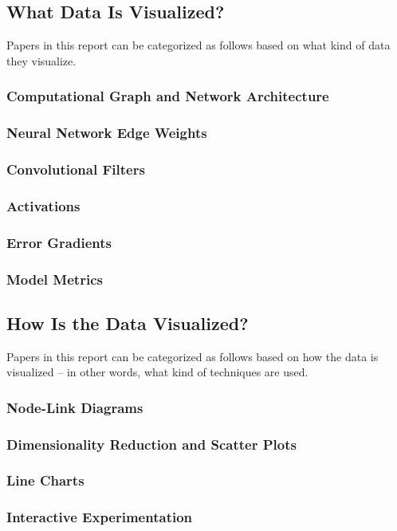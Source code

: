\documentclass{acmsiggraph}               %
\begin{document}
\subsection{What Data Is Visualized?}
Papers in this report can be categorized as follows based on what kind of data they visualize.
\subsubsection{Computational Graph and Network Architecture}
\subsubsection{Neural Network Edge Weights}
\subsubsection{Convolutional Filters}
\subsubsection{Activations}
\subsubsection{Error Gradients}
\subsubsection{Model Metrics}

\subsection{How Is the Data Visualized?}
Papers in this report can be categorized as follows based on how the data is visualized -- in other words, what kind of techniques are used.
\subsubsection{Node-Link Diagrams}
\subsubsection{Dimensionality Reduction and Scatter Plots}
\subsubsection{Line Charts}
\subsubsection{Interactive Experimentation}
\end{document}
